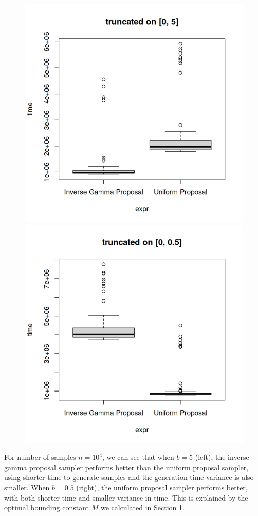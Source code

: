 \vspace{-0.6cm}

\begin{figure}[h]
    \centering
    \includegraphics[width=0.48\columnwidth, height=0.3\columnwidth, keepaspectratio]{imgs/b_eq_5.png}%
    \hspace{0.01\columnwidth}%
    \includegraphics[width=0.48\columnwidth, height=0.3\columnwidth, keepaspectratio]{imgs/b_eq_05.png}
    \label{fig:performance}
\end{figure}

\vspace{-0.6cm}

For number of samples \(n = 10^4\), we can see that when \(b = 5\) (left), the inverse-gamma proposal sampler performs better than the uniform proposal sampler, using shorter time to generate samples and the generation time variance is also smaller. When \(b = 0.5\) (right), the uniform proposal sampler performs better, with both shorter time and smaller variance in time. This is explained by the optimal bounding constant \(M\) we calculated in Section 1.

